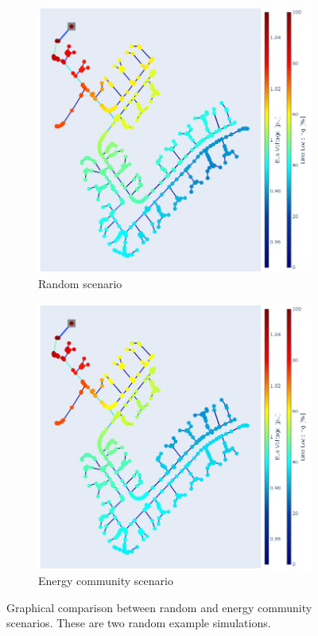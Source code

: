 \documentclass[a4paper,10pt]{report}
\begin{document}
\FloatBarrier
\begin{figure}[htpb]
	\centering
	\begin{subfigure}[b]{0.475\textwidth}
		\centering
		\includegraphics[width=\textwidth]{random_loads_min_full}
		\caption[]
		{{\small Random scenario}}    
		\label{random_vs_en_comm_a}
	\end{subfigure}
	\hfill
	\begin{subfigure}[b]{0.475\textwidth}  
		\centering 
		\includegraphics[width=\textwidth]{en_comm_min_full}
		\caption[]
		{{\small Energy community scenario}}    
		\label{random_vs_en_comm_b}
	\end{subfigure}
	\caption[Comparison of hosting capacities for random and energy community scenarios]
	{\small Graphical comparison between random and energy community scenarios. These are two random example simulations.} 
	\label{random_vs_en_comm}
\end{figure}
\FloatBarrier
\end{document}
